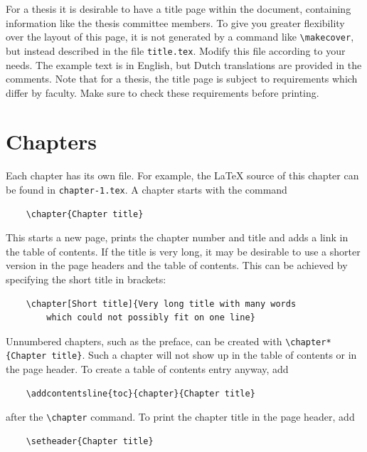 For a thesis it is desirable to have a title page within the document, containing information like the thesis committee members. To give you greater flexibility over the layout of this page, it is not generated by a command like \verb|\makecover|, but instead described in the file \texttt{title.tex}. Modify this file according to your needs. The example text is in English, but Dutch translations are provided in the comments. Note that for a thesis, the title page is subject to requirements which differ by faculty. Make sure to check these requirements before printing.

\section{Chapters}

Each chapter has its own file. For example, the \LaTeX{} source of this chapter can be found in \texttt{chapter-1.tex}. A chapter starts with the command
\begin{verbatim}
    \chapter{Chapter title}
\end{verbatim}
This starts a new page, prints the chapter number and title and adds a link in the table of contents. If the title is very long, it may be desirable to use a shorter version in the page headers and the table of contents. This can be achieved by specifying the short title in brackets:
\begin{verbatim}
    \chapter[Short title]{Very long title with many words 
        which could not possibly fit on one line}
\end{verbatim}
Unnumbered chapters, such as the preface, can be created with \verb|\chapter*{Chapter title}|. Such a chapter will not show up in the table of contents or in the page header. To create a table of contents entry anyway, add
\begin{verbatim}
    \addcontentsline{toc}{chapter}{Chapter title}
\end{verbatim}
after the \verb|\chapter| command. To print the chapter title in the page header, add
\begin{verbatim}
    \setheader{Chapter title}
\end{verbatim}


